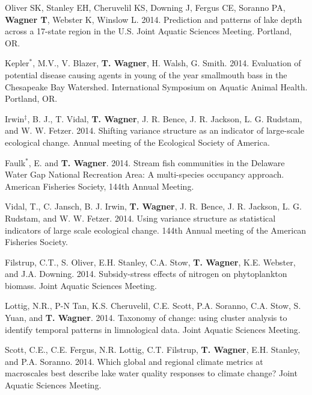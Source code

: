 \documentclass[10pt]{article}
\begin{document}
\begin{flushleft}
\begin{etaremune}
\item Oliver SK, Stanley EH, Cheruvelil KS, Downing J, Fergus CE, Soranno PA, {\bf Wagner T}, Webster K, Winslow L. 2014. Prediction and patterns of lake depth across a 17-state region in the U.S. Joint Aquatic Sciences Meeting. Portland, OR.

\item Kepler$^*$, M.V., V. Blazer, {\bf T. Wagner}, H. Walsh, G. Smith. 2014. Evaluation of potential disease causing agents in young of the year smallmouth bass in the Chesapeake Bay Watershed. International Symposium on Aquatic Animal Health. Portland, OR. 

\item Irwin$^\ddagger$, B. J., T. Vidal, {\bf T. Wagner}, J. R. Bence, J. R. Jackson, L. G. Rudstam, and W. W. Fetzer. 2014. Shifting variance structure as an indicator of large-scale ecological change. Annual meeting of the Ecological Society of America.

\item Faulk$^*$, E. and {\bf T. Wagner}. 2014. Stream fish communities in the Delaware Water Gap National Recreation Area: A multi-species occupancy approach. American Fisheries Society, 144th Annual Meeting.

\item Vidal, T., C. Jansch, B. J. Irwin, {\bf T. Wagner}, J. R. Bence, J. R. Jackson, L. G. Rudstam, and W. W. Fetzer. 2014. Using variance structure as statistical indicators of large scale ecological change. 144th Annual meeting of the American Fisheries Society.  

\item Filstrup, C.T., S. Oliver, E.H. Stanley, C.A. Stow, {\bf T. Wagner}, K.E. Webster, and J.A. Downing. 2014. Subsidy-stress effects of nitrogen on phytoplankton biomass. Joint Aquatic Sciences Meeting. 

\item Lottig, N.R., P-N Tan, K.S. Cheruvelil, C.E. Scott, P.A. Soranno, C.A. Stow, S. Yuan, and {\bf T. Wagner}. 2014. Taxonomy of change: using cluster analysis to identify temporal patterns in limnological data. Joint Aquatic Sciences Meeting. 

\item Scott, C.E., C.E. Fergus, N.R. Lottig, C.T. Filstrup, {\bf T. Wagner}, E.H. Stanley, and P.A. Soranno. 2014. Which global and regional climate metrics at macroscales best describe lake water quality responses to climate change? Joint Aquatic Sciences Meeting. 


\end{etaremune}
\end{flushleft}
\end{document}
